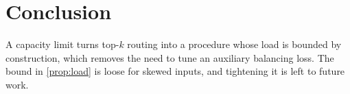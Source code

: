 \documentclass{article}
\begin{document}
\section{Conclusion}
\label{sec:conclusion}

A capacity limit turns top-$k$ routing into a procedure whose load is bounded by construction, which removes the need to tune an auxiliary balancing loss.
The bound in \cref{prop:load} is loose for skewed inputs, and tightening it is left to future work.




\appendix

\end{document}
